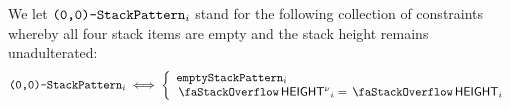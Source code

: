 We let $\texttt{(0,0)-}\texttt{StackPattern}_{i}$ stand for the following collection of constraints whereby all four stack items are empty and the stack height remains unadulterated:
\[
	\zeroZeroSP_{i}
	\iff
	\left\{
	\begin{array}{l}
		\emptySP_{i}									\\
		\stackHeight{}\new{}_{i} = \stackHeight{}_{i}	\\
	\end{array}
	\right.
\]
